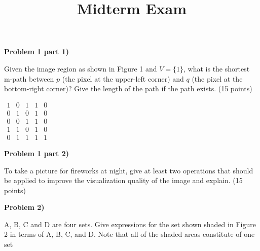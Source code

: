 \documentclass[12pt]{article}
\title{\textbf{Midterm Exam}}
\author{}
\date{}
\newcommand{\problem}[1]{%
  \vspace{0.5cm}
  {\noindent\normalsize \textbf{#1}}
  \vspace{0.3cm}
}
\begin{document}
\thispagestyle{fancy}
\setlength{\parindent}{0pt}



\problem{Problem 1 part 1)}

Given the image region as shown in Figure 1 and $V = \{1\}$, what is the shortest m-path between $p$
(the pixel at the upper-left corner) and $q$ (the pixel at the bottom-right corner)? Give the length of
the path if the path exists. (15 points)

\begin{center}
$\begin{array}{ccccc}
1 & 0 & 1 & 1 & 0 \\
0 & 1 & 0 & 1 & 0 \\
0 & 0 & 1 & 1 & 0 \\
1 & 1 & 0 & 1 & 0 \\
0 & 1 & 1 & 1 & 1
\end{array}$
\end{center}

\vspace{2cm}

\problem{Problem 1 part 2)}

To take a picture for fireworks at night, give at least two operations that should be applied to
improve the visualization quality of the image and explain. (15 points)

\newpage


\problem{Problem 2)}

A, B, C and D are four sets. Give expressions for the set shown shaded in Figure 2 in terms of A,
B, C, and D. Note that all of the shaded areas constitute of one set
\end{document}
